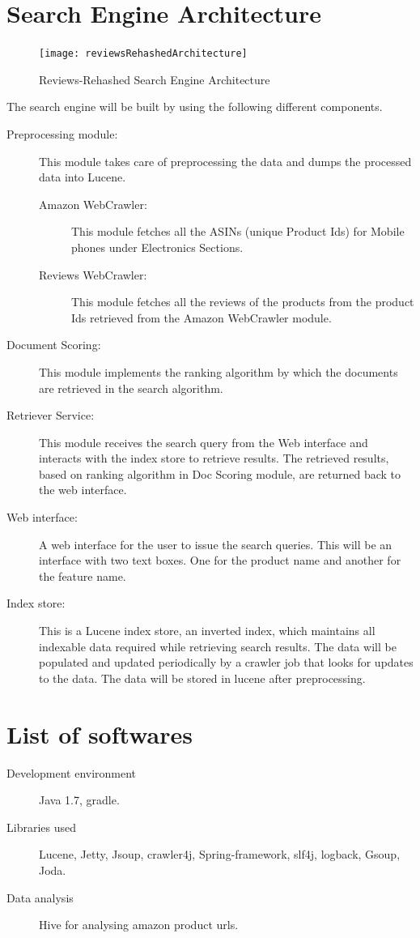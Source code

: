 \documentclass{article}
\begin{document}
\section{Search Engine Architecture}
\begin{figure}[ht!]
  \centering
  \texttt{[image: reviewsRehashedArchitecture]}
  \caption{Reviews-Rehashed Search Engine Architecture\label{fig:Search_Engine}}
\end{figure}
The search engine will be built by using the following different components.
\begin{description}
  \item[Preprocessing module:]  This module takes care of preprocessing the data and dumps the processed data into Lucene.
  \begin{description}
	 \item[Amazon WebCrawler:] This module fetches all the ASINs (unique Product Ids) for Mobile phones under Electronics Sections.
	 \item[Reviews WebCrawler:] This module fetches all the reviews of the products from the product Ids retrieved from the Amazon WebCrawler module.
  \end{description}
  \item[Document Scoring: ] This module implements the ranking algorithm by which the documents are retrieved in the search algorithm.
  \item[Retriever Service: ] This module receives the search query from the Web interface and interacts with the index store to retrieve results. The retrieved results, based on ranking algorithm in Doc Scoring module, are returned back to the web interface.
  \item[Web interface:] A web interface for the user to issue the search queries.  This will be an interface with two text boxes. One for the product name and another for the feature name.
  \item[Index store:]  This is a Lucene index store, an inverted index, which maintains all indexable data required while retrieving search results.  The data will be populated and updated periodically by a crawler job that looks for updates to the data.  The data will be stored in lucene after preprocessing.
\end{description}

\section{List of softwares}
\begin{description}
  \item[Development environment] Java 1.7, gradle.
  \item[Libraries used] Lucene, Jetty, Jsoup, crawler4j, Spring-framework, slf4j, logback, Gsoup, Joda.
  \item[Data analysis] Hive for analysing amazon product urls.
\end{description}
\end{document}

